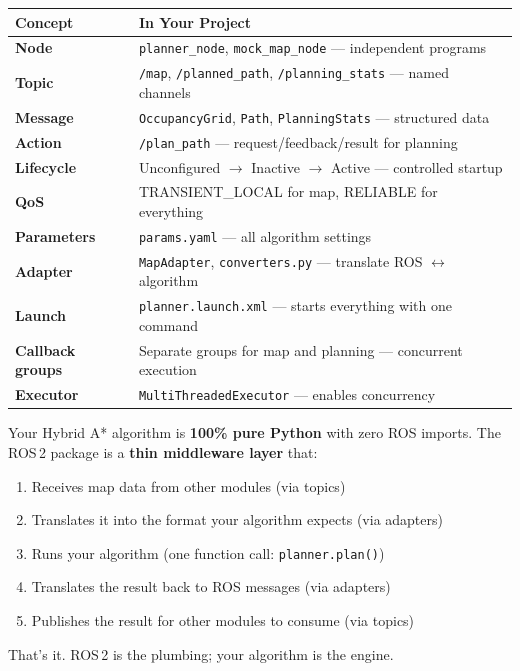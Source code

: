 \documentclass[12pt, a4paper]{article}
\begin{document}
\begin{center}
\begin{tabular}{lp{10cm}}
    \toprule
    \textbf{Concept} & \textbf{In Your Project} \\
    \midrule
    \textbf{Node} & \texttt{planner\_node}, \texttt{mock\_map\_node} --- independent programs \\
    \textbf{Topic} & \texttt{/map}, \texttt{/planned\_path}, \texttt{/planning\_stats} --- named channels \\
    \textbf{Message} & \texttt{OccupancyGrid}, \texttt{Path}, \texttt{PlanningStats} --- structured data \\
    \textbf{Action} & \texttt{/plan\_path} --- request/feedback/result for planning \\
    \textbf{Lifecycle} & Unconfigured $\to$ Inactive $\to$ Active --- controlled startup \\
    \textbf{QoS} & TRANSIENT\_LOCAL for map, RELIABLE for everything \\
    \textbf{Parameters} & \texttt{params.yaml} --- all algorithm settings \\
    \textbf{Adapter} & \texttt{MapAdapter}, \texttt{converters.py} --- translate ROS $\leftrightarrow$ algorithm \\
    \textbf{Launch} & \texttt{planner.launch.xml} --- starts everything with one command \\
    \textbf{Callback groups} & Separate groups for map and planning --- concurrent execution \\
    \textbf{Executor} & \texttt{MultiThreadedExecutor} --- enables concurrency \\
    \bottomrule
\end{tabular}
\end{center}

\vspace{1em}

\begin{keybox}
Your Hybrid A* algorithm is \textbf{100\% pure Python} with zero ROS imports.
The ROS\,2 package is a \textbf{thin middleware layer} that:
\begin{enumerate}[nosep]
    \item Receives map data from other modules (via topics)
    \item Translates it into the format your algorithm expects (via adapters)
    \item Runs your algorithm (one function call: \texttt{planner.plan()})
    \item Translates the result back to ROS messages (via adapters)
    \item Publishes the result for other modules to consume (via topics)
\end{enumerate}
That's it. ROS\,2 is the plumbing; your algorithm is the engine.
\end{keybox}
\end{document}
